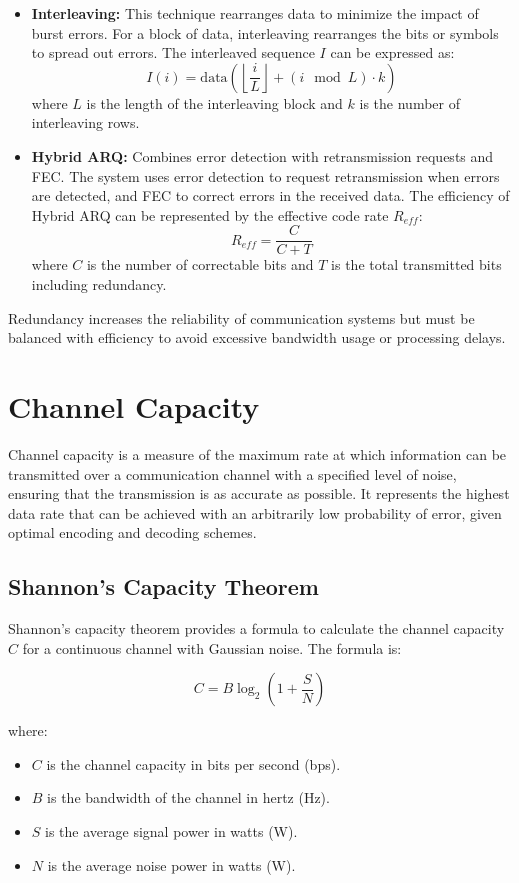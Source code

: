 \documentclass{article}
\begin{document}
\begin{itemize}
    \item \textbf{Interleaving:} This technique rearranges data to minimize the impact of burst errors. For a block of data, interleaving rearranges the bits or symbols to spread out errors. The interleaved sequence $I$ can be expressed as:
    \[
    I(i) = \text{data}\left(\left\lfloor \frac{i}{L} \right\rfloor + (i \mod L) \cdot k \right)
    \]
    where $L$ is the length of the interleaving block and $k$ is the number of interleaving rows.
    
    \item \textbf{Hybrid ARQ:} Combines error detection with retransmission requests and FEC. The system uses error detection to request retransmission when errors are detected, and FEC to correct errors in the received data. The efficiency of Hybrid ARQ can be represented by the effective code rate $R_{eff}$:
    \[
    R_{eff} = \frac{C}{C + T}
    \]
    where $C$ is the number of correctable bits and $T$ is the total transmitted bits including redundancy.
\end{itemize}

Redundancy increases the reliability of communication systems but must be balanced with efficiency to avoid excessive bandwidth usage or processing delays.

\section{Channel Capacity}

Channel capacity is a measure of the maximum rate at which information can be transmitted over a communication channel with a specified level of noise, ensuring that the transmission is as accurate as possible. It represents the highest data rate that can be achieved with an arbitrarily low probability of error, given optimal encoding and decoding schemes.

\subsection{Shannon's Capacity Theorem}

Shannon's capacity theorem provides a formula to calculate the channel capacity \(C\) for a continuous channel with Gaussian noise. The formula is:

\[
C = B \log_2 \left(1 + \frac{S}{N}\right)
\]

where:
\begin{itemize}
    \item \(C\) is the channel capacity in bits per second (bps).
    \item \(B\) is the bandwidth of the channel in hertz (Hz).
    \item \(S\) is the average signal power in watts (W).
    \item \(N\) is the average noise power in watts (W).
\end{itemize}
\end{document}
